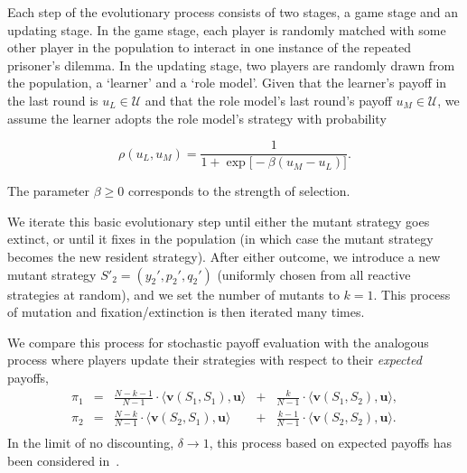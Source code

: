 \documentclass[11pt]{article}
\theoremstyle{plainCl1}
\theoremstyle{plainCl2}
\begin{document}
Each step of the evolutionary process consists of two stages, a game stage and
an updating stage. In the game stage, each player is randomly matched with some
other player in the population to interact in one instance of the repeated
prisoner's dilemma. In the updating stage, two players are randomly drawn from
the population, a `learner' and a `role model'. Given that the learner's payoff
in the last round is $u_L\!\in\! \mathcal{U}$ and that the role model's last
round's payoff $u_M\!\in\! \mathcal{U}$, we assume the learner adopts the role
model's strategy with probability 

\begin{equation} \label{Eq:rho}
\rho(u_L, u_M) = \frac{1}{1\!+\!\exp\big[ \!-\!\beta (u_M\!-\!u_L) \big]}. 
\end{equation}

The parameter $\beta\!\ge\!0$ corresponds to the strength of selection.

We iterate this basic evolutionary step until either the mutant strategy goes
extinct, or until it fixes in the population (in which case the mutant strategy
becomes the new resident strategy). After either outcome, we introduce a new
mutant strategy $S'_2\!=\!(y_2',p_2',q_2')$ (uniformly chosen from all reactive
strategies at random), and we set the number of mutants to $k\!=\!1$. This
process of mutation and fixation/extinction is then iterated many times. 

We compare this process for stochastic payoff evaluation with the analogous
process where players update their strategies with respect to their {\it
expected} payoffs,
\begin{equation} \label{Eq:ExpPay}
\begin{array}{lcrcr}
\displaystyle \pi_1	&=	&\displaystyle \frac{N\!-\!k\!-\!1}{N-1}\cdot \langle\mathbf{v}(S_1,S_1),\mathbf{u}\rangle	&+	&\displaystyle\frac{k}{N-1}\cdot \langle\mathbf{v}(S_1,S_2),\mathbf{u}\rangle,\\[0.5cm]
\displaystyle \pi_2	&=	&\displaystyle\frac{N-k}{N-1}\cdot \langle\mathbf{v}(S_2,S_1),\mathbf{u}\rangle&+	&\displaystyle\frac{k-1}{N-1}\cdot \langle\mathbf{v}(S_2,S_2),\mathbf{u}\rangle.\\
\end{array}
\end{equation}
In the limit of no discounting, $\delta\!\rightarrow\! 1$, this process based on
expected payoffs has been considered in~\cite{imhof:prsb:2010}. 
\end{document}
